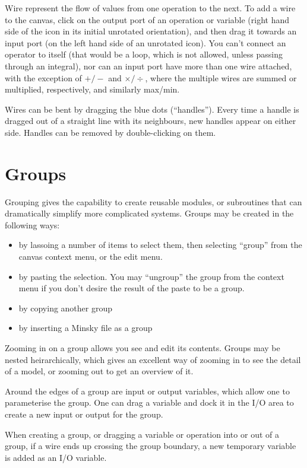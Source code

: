 Wire represent the flow of values from one operation to the next. To
add a wire to the canvas, click on the output port of an operation or
variable (right hand side of the icon in its initial unrotated
orientation), and then drag it towards an input port (on the left hand
side of an unrotated icon). You can't connect an operator to itself
(that would be a loop, which is not allowed, unless passing through an
integral), nor can an input port have more than one wire
attached, with the exception of $+/-$ and $\times/\div$, where the
multiple wires are summed or multiplied, respectively, and similarly max/min.

Wires can be bent by dragging the blue dots (``handles''). Every time
a handle is dragged out of a straight line with its neighbours, new
handles appear on either side. Handles can be removed by
double-clicking on them.

\section{Groups}\label{Group}

Grouping gives the capability to create reusable modules, or subroutines that
can dramatically simplify more complicated systems. Groups may be
created in the following ways:
\begin{itemize}
\item by lassoing a number of items to select them, then selecting
``group'' from the canvas context menu, or the edit menu.
\item by pasting the selection. You may ``ungroup'' the group from the
context menu if you don't desire the result of the paste to be a group.
\item by copying another group
\item by inserting a Minsky file as a group
\end{itemize}

Zooming in on a group allows you see and edit its contents. Groups may
be nested heirarchically, which gives an excellent way of zooming in
to see the detail of a model, or zooming out to get an overview of it.

Around the edges of a group are input or output variables, which allow
one to parameterise the group. One can drag a variable and dock it in
the I/O area to create a new input or output for the group.

When creating a group, or dragging a variable or operation into or out
of a group, if a wire ends up crossing the group boundary, a new
temporary variable is added as an I/O variable.

